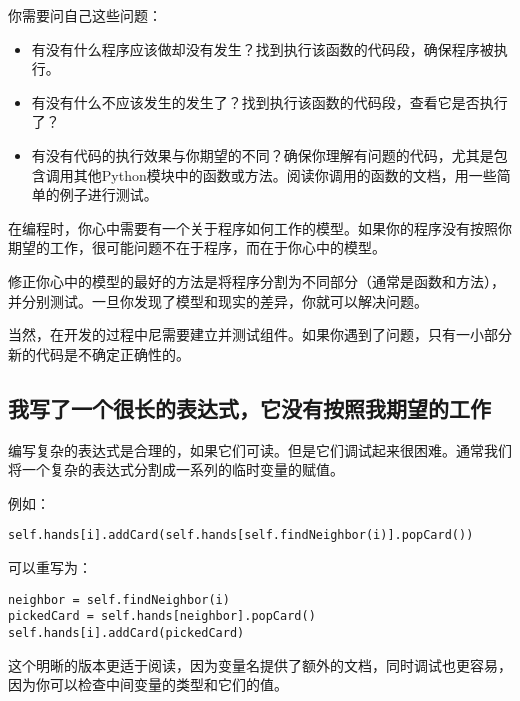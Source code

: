 你需要问自己这些问题：

\begin{itemize}

\item 有没有什么程序应该做却没有发生？找到执行该函数的代码段，确保程序被执行。

\item 有没有什么不应该发生的发生了？找到执行该函数的代码段，查看它是否执行了？

\item 有没有代码的执行效果与你期望的不同？确保你理解有问题的代码，尤其是包含调用其他Python模块中的函数或方法。阅读你调用的函数的文档，用一些简单的例子进行测试。

\end{itemize}

在编程时，你心中需要有一个关于程序如何工作的模型。如果你的程序没有按照你期望的工作，很可能问题不在于程序，而在于你心中的模型。


修正你心中的模型的最好的方法是将程序分割为不同部分（通常是函数和方法），并分别测试。一旦你发现了模型和现实的差异，你就可以解决问题。

当然，在开发的过程中尼需要建立并测试组件。如果你遇到了问题，只有一小部分新的代码是不确定正确性的。


\subsection{我写了一个很长的表达式，它没有按照我期望的工作}


编写复杂的表达式是合理的，如果它们可读。但是它们调试起来很困难。通常我们将一个复杂的表达式分割成一系列的临时变量的赋值。

例如：

\beforeverb
\begin{verbatim}
self.hands[i].addCard(self.hands[self.findNeighbor(i)].popCard())
\end{verbatim}
\afterverb
%
可以重写为：

\beforeverb
\begin{verbatim}
neighbor = self.findNeighbor(i)
pickedCard = self.hands[neighbor].popCard()
self.hands[i].addCard(pickedCard)
\end{verbatim}
\afterverb
%
这个明晰的版本更适于阅读，因为变量名提供了额外的文档，同时调试也更容易，因为你可以检查中间变量的类型和它们的值。

